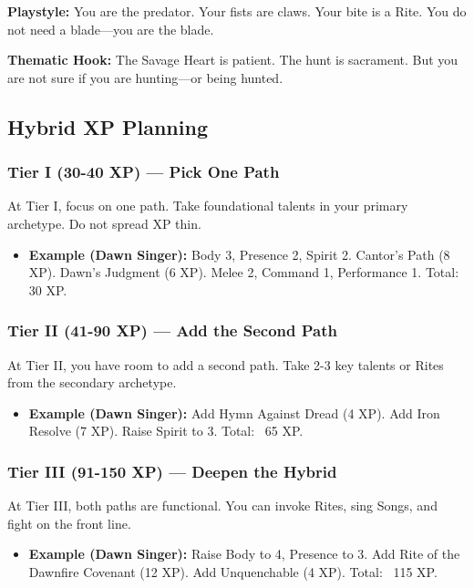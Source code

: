 \textbf{Playstyle:} You are the predator. Your fists are claws. Your bite is a Rite. You do not need a blade—you are the blade.

\textbf{Thematic Hook:} The Savage Heart is patient. The hunt is sacrament. But you are not sure if you are hunting—or being hunted.

\subsection{Hybrid XP Planning}

\subsubsection{Tier I (30-40 XP) — Pick One Path}

At Tier I, focus on one path. Take foundational talents in your primary archetype. Do not spread XP thin.

\begin{itemize}
\item \textbf{Example (Dawn Singer):} Body 3, Presence 2, Spirit 2. Cantor's Path (8 XP). Dawn's Judgment (6 XP). Melee 2, Command 1, Performance 1. Total: 30 XP.
\end{itemize}

\subsubsection{Tier II (41-90 XP) — Add the Second Path}

At Tier II, you have room to add a second path. Take 2-3 key talents or Rites from the secondary archetype.

\begin{itemize}
\item \textbf{Example (Dawn Singer):} Add Hymn Against Dread (4 XP). Add Iron Resolve (7 XP). Raise Spirit to 3. Total: ~65 XP.
\end{itemize}

\subsubsection{Tier III (91-150 XP) — Deepen the Hybrid}

At Tier III, both paths are functional. You can invoke Rites, sing Songs, and fight on the front line.

\begin{itemize}
\item \textbf{Example (Dawn Singer):} Raise Body to 4, Presence to 3. Add Rite of the Dawnfire Covenant (12 XP). Add Unquenchable (4 XP). Total: ~115 XP.
\end{itemize}

